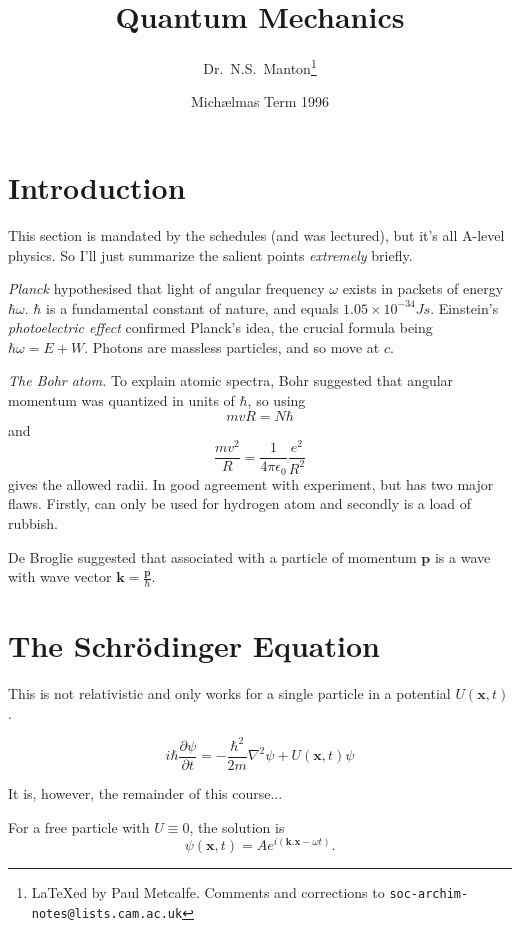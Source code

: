 \documentclass[a4paper]{article}
\newcommand{\eps}{\epsilon_0}
\newcommand{\pd}[2]{\frac{\partial #1}{\partial #2}}
\newcommand{\schrod}{Schr{\"o}dinger }
\begin{document}
\title{Quantum Mechanics}
\author{Dr.~N.S.~Manton\thanks{\LaTeX ed by Paul Metcalfe.  Comments and
corrections to \texttt{soc-archim-notes@lists.cam.ac.uk}}}
\date{Mich\ae lmas Term 1996}
\maketitle

\tableofcontents

\section{Introduction}

This section is mandated by the schedules (and was lectured), but it's 
all A-level physics.  So I'll just summarize the salient points 
\emph{extremely} briefly.

\emph{Planck} hypothesised that light of angular frequency $\omega$ exists
in packets of energy $\hbar \omega$.  $\hbar$ is a fundamental constant of
nature, and equals $1.05 \times 10^{-34} Js$.  Einstein's 
\emph{photoelectric effect} confirmed Planck's idea, the crucial formula
being $\hbar \omega = E + W$.  Photons are massless particles, and so move at
$c$.

\emph{The Bohr atom.}  To explain atomic spectra, Bohr suggested that angular 
momentum was quantized in units of $\hbar$, so using
\[
m v R = N \hbar
\] and
\[
\frac{m v^2}{R} = \frac{1}{4\pi \eps}\frac{e^2}{R^2}
\] gives the allowed radii.  In good agreement with experiment, but has two
major flaws.  Firstly, can only be used for hydrogen atom and secondly is 
a load of rubbish.

De Broglie suggested that associated with a particle of momentum $\mathbf{p}$
is a wave with wave vector $\mathbf{k}=\frac{\mathbf{p}}{\hbar}$.

\section{The \schrod Equation}

This is not relativistic and only works for a single particle in a potential
$U(\mathbf{x},t)$.

\[
i\hbar \pd{\psi}{t} = -\frac{\hbar^2}{2m}\nabla^2 \psi + U(\mathbf{x},t)\psi
\]

It is, however, the remainder of this course...

For a free particle with $U\equiv 0$, the solution is 
\[
\psi(\mathbf{x},t) = A e^{i(\mathbf{k}.\mathbf{x} - \omega t)}.
\]
\end{document}
